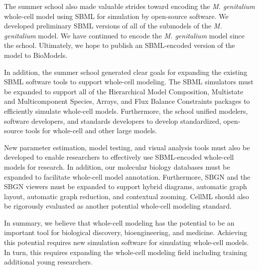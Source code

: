\documentclass[journal,transmag]{IEEEtran}
\begin{document}
The summer school also made valuable strides toward encoding the \textit{M. genitalium} whole-cell model using SBML for simulation by open-source software. We developed preliminary SBML versions of all of the submodels of the \textit{M. genitalium} model. We have continued to encode the \textit{M. genitalium} model since the school. Ultimately, we hope to publish an SBML-encoded version of the model to BioModels. 

In addition, the summer school generated clear goals for expanding the existing SBML software tools to support whole-cell modeling. The SBML simulators must be expanded to support all of the Hierarchical Model Composition, Multistate and Multicomponent Species, Arrays, and Flux Balance Constraints packages to efficiently simulate whole-cell models. Furthermore, the school unified modelers, software developers, and standards developers to develop standardized, open-source tools for whole-cell and other large models.

New parameter estimation, model testing, and visual analysis tools must also be developed to enable researchers to effectively use SBML-encoded whole-cell models for research. In addition, our molecular biology databases must be expanded to facilitate whole-cell model annotation. Furthermore, SBGN and the SBGN viewers must be expanded to support hybrid diagrams, automatic graph layout, automatic graph reduction, and contextual zooming. CellML should also be rigorously evaluated as another potential whole-cell modeling standard.

In summary, we believe that whole-cell modeling has the potential to be an important tool for biological discovery, bioengineering, and medicine. Achieving this potential requires new simulation software for simulating whole-cell models. In turn, this requires expanding the whole-cell modeling field including training additional young researchers.

\ifCLASSOPTIONcaptionsoff
  \newpage
\fi




% 
\end{document}
